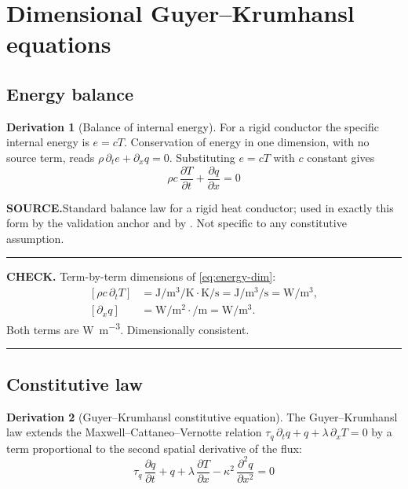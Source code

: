\documentclass[11pt,a4paper]{article}
\theoremstyle{definition}
\newtheorem{derivationx}{Derivation}[section]
\newenvironment{checkbox}%
  {\par\medskip\noindent\begin{minipage}{\linewidth}%
   \rule{\linewidth}{0.4pt}\par\noindent\textbf{CHECK.}\enspace}%
  {\par\rule{\linewidth}{0.4pt}\end{minipage}\par\medskip}
\newcommand{\source}[1]{\par\smallskip\noindent\textbf{SOURCE.}\enspace #1\par}
\newcommand{\tq}{\tau_{q}}
\newcommand{\kk}{\kappa^{2}}
\begin{document}
\section{Dimensional Guyer--Krumhansl equations}
\label{sec:dimensional}

\subsection{Energy balance}

\begin{derivationx}[Balance of internal energy]
\label{der:energy}
For a rigid conductor the specific internal energy is $e=cT$. Conservation of
energy in one dimension, with no source term, reads
$\rho\,\partial_{t}e + \partial_{x}q = 0$. Substituting $e=cT$ with $c$
constant gives
\begin{equation}
  \boxed{\ \rho c\,\frac{\partial T}{\partial t}
        + \frac{\partial q}{\partial x} = 0\ }
  \label{eq:energy-dim}
\end{equation}
\end{derivationx}

\source{Standard balance law for a rigid heat conductor; used in exactly this
form by the validation anchor \cite{Kovacs2018} and by
\cite{Both2016,Van2017}. Not specific to any constitutive assumption.}

\begin{checkbox}
Term-by-term dimensions of \eqref{eq:energy-dim}:
\begin{align*}
  \left[\rho c\,\partial_{t}T\right]
    &= \si{\joule\per\metre\cubed\per\kelvin}\cdot
       \si{\kelvin\per\second}
     = \si{\joule\per\metre\cubed\per\second}
     = \si{\watt\per\metre\cubed} , \\
  \left[\partial_{x}q\right]
    &= \si{\watt\per\metre\squared}\cdot\si{\per\metre}
     = \si{\watt\per\metre\cubed} .
\end{align*}
Both terms are \si{\watt\per\metre\cubed}. Dimensionally consistent.
\end{checkbox}

\subsection{Constitutive law}

\begin{derivationx}[Guyer--Krumhansl constitutive equation]
\label{der:gk}
The Guyer--Krumhansl law extends the Maxwell--Cattaneo--Vernotte relation
$\tq\,\partial_{t}q + q + \lambda\,\partial_{x}T = 0$ by a term proportional to
the second spatial derivative of the flux:
\begin{equation}
  \boxed{\ \tq\,\frac{\partial q}{\partial t}
        + q
        + \lambda\,\frac{\partial T}{\partial x}
        - \kk\,\frac{\partial^{2} q}{\partial x^{2}} = 0\ }
  \label{eq:gk-dim}
\end{equation}
\end{derivationx}
\end{document}
